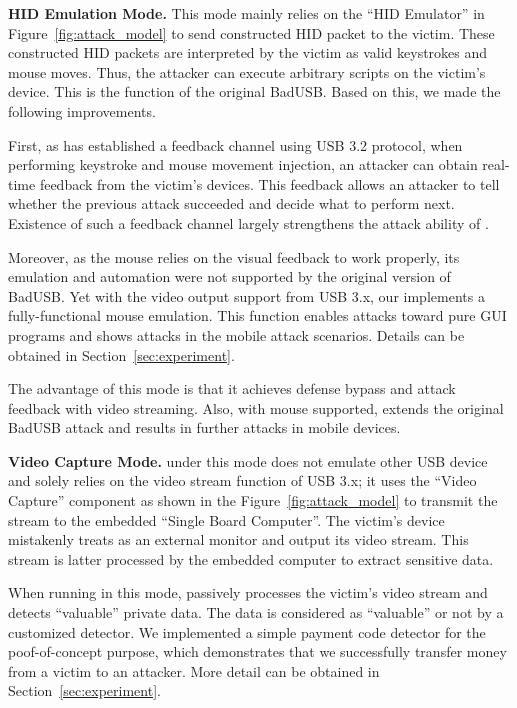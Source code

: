 \textbf{\ac{HID} Emulation Mode.} This mode mainly relies on the ``\ac{HID} Emulator'' in Figure~\ref{fig:attack_model} to
send constructed \ac{HID} packet to the victim. These constructed \ac{HID} packets are
interpreted by the victim as valid keystrokes and mouse moves. Thus, the
attacker can execute arbitrary scripts on the victim's device. This is the
function of the original BadUSB. Based on this, we made the following
improvements.

First, as \tool has established a feedback channel using \ac{USB} 3.2 protocol, when performing keystroke and mouse movement injection, an attacker can obtain real-time feedback from the victim's devices. This feedback allows an attacker to tell whether the previous attack succeeded and decide what to perform next. Existence of such a feedback channel largely strengthens the attack ability of \tool.

Moreover, as the mouse relies on the visual feedback to work properly, its
emulation and automation were not supported by the original version of BadUSB.
Yet with the video output support from \ac{USB} 3.x, our \tool implements a
fully-functional mouse emulation. This function enables attacks toward pure \ac{GUI}
programs and shows attacks in the mobile attack scenarios. Details can
be obtained in Section~\ref{sec:experiment}.

The advantage of this mode is that it achieves defense bypass and attack
feedback with video streaming.  
Also, with mouse
supported, \tool extends the original BadUSB attack and results in further attacks in
mobile devices.

\textbf{Video Capture Mode.} \tool under this mode does not emulate other
USB device and solely relies on the video stream function of \ac{USB} 3.x; it uses the 
``Video Capture'' component as shown in the Figure~\ref{fig:attack_model} to transmit the stream to the embedded ``Single Board Computer''.
The victim's device mistakenly treats \tool as an external monitor
and output its video stream. This stream is latter processed by the embedded
computer to extract sensitive data.

When running in this mode, \tool passively processes the victim's video stream
and detects ``valuable'' private data.  The data is considered as
``valuable'' or not by a customized detector. We implemented a simple
payment code detector for the poof-of-concept purpose, which demonstrates that we successfully transfer money from a victim to an
attacker. More detail can be obtained in Section~\ref{sec:experiment}.


